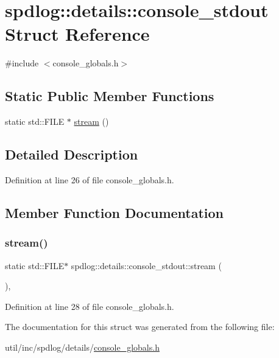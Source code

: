 \hypertarget{structspdlog_1_1details_1_1console__stdout}{}\section{spdlog\+:\+:details\+:\+:console\+\_\+stdout Struct Reference}
\label{structspdlog_1_1details_1_1console__stdout}


{\ttfamily \#include $<$console\+\_\+globals.\+h$>$}

\subsection*{Static Public Member Functions}
\begin{DoxyCompactItemize}
\item 
static std\+::\+F\+I\+LE $\ast$ \hyperlink{structspdlog_1_1details_1_1console__stdout_a949fac14432044c2b3f5186a0693b306}{stream} ()
\end{DoxyCompactItemize}


\subsection{Detailed Description}


Definition at line 26 of file console\+\_\+globals.\+h.



\subsection{Member Function Documentation}
\mbox{\label{structspdlog_1_1details_1_1console__stdout_a949fac14432044c2b3f5186a0693b306}} 
\subsubsection{\texorpdfstring{stream()}{stream()}}
{\footnotesize\ttfamily static std\+::\+F\+I\+LE$\ast$ spdlog\+::details\+::console\+\_\+stdout\+::stream (\begin{DoxyParamCaption}{ }\end{DoxyParamCaption})\hspace{0.3cm}{\ttfamily [inline]}, {\ttfamily [static]}}



Definition at line 28 of file console\+\_\+globals.\+h.



The documentation for this struct was generated from the following file\+:\begin{DoxyCompactItemize}
\item 
util/inc/spdlog/details/\hyperlink{console__globals_8h}{console\+\_\+globals.\+h}\end{DoxyCompactItemize}
